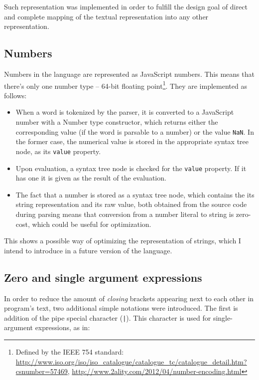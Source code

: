 Such representation was implemented in order to fulfill the design goal of
direct and complete mapping of the textual representation into any other
representation.

\subsection{Numbers}
Numbers in the language are represented as JavaScript numbers. This means that
there's only one number type -- 64-bit floating point\footnote{Defined by the
  IEEE 754 standard:
  \url{http://www.iso.org/iso/iso_catalogue/catalogue_tc/catalogue_detail.htm?csnumber=57469},
  \url{http://www.2ality.com/2012/04/number-encoding.html}}. They are
implemented as follows:
\begin{itemize}
    \item When a word is tokenized by the parser, it is converted to a
      JavaScript number with a Number type constructor, which returns either the
      corresponding value (if the word is parsable to a number) or the value
      \texttt{NaN}. In the former case, the numerical value is stored in the
      appropriate syntax tree node, as its \texttt{value} property.
    \item Upon evaluation, a syntax tree node is checked for the \texttt{value}
      property. If it has one it is given as the result of the evaluation.
    \item The fact that a number is stored as a syntax tree node, which contains
      the its string representation and its raw value, both obtained from the
      source code during parsing means that conversion from a number literal to
      string is zero-cost, which could be useful for optimization.
\end{itemize}

This shows a possible way of optimizing the representation of strings, which I
intend to introduce in a future version of the language.

\subsection{Zero and single argument expressions}
In order to reduce the amount of \textit{closing} brackets appearing next to
each other in program's text, two additional simple notations were
introduced. The first is addition of the pipe special character
(\texttt{|}). This character is used for single-argument expressions, as in:

